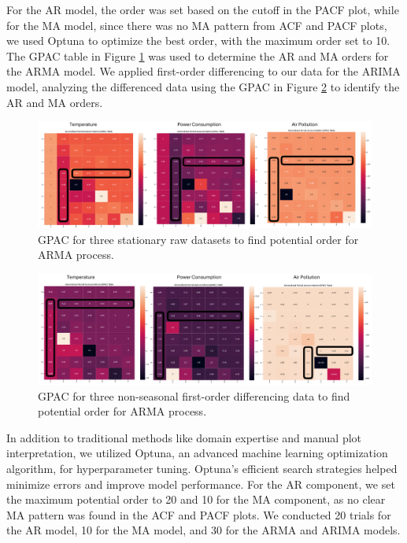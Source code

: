 \documentclass[sn-mathphys-num]{sn-jnl}
\theoremstyle{thmstyleone}%
\theoremstyle{thmstyletwo}%
\theoremstyle{thmstylethree}%
\begin{document}
For the AR model, the order was set based on the cutoff in the PACF plot, while for the MA model, since there was no MA pattern from ACF and PACF plots, we used Optuna to optimize the best order, with the maximum order set to 10. The GPAC table in Figure \ref{fig:gpac1}  was used to determine the AR and MA orders for the ARMA model. We applied first-order differencing to our data for the ARIMA model, analyzing the differenced data using the GPAC in Figure \ref{fig:gpac2} to identify the AR and MA orders.
\begin{figure}[H]
	\begin{center}
		\includegraphics[scale=0.6]{gpac1.pdf}
	\end{center}
	\caption{GPAC for three stationary raw datasets to find potential order for ARMA process.}
	\label{fig:gpac1}
\end{figure}

\begin{figure}[H]
	\begin{center}
		\includegraphics[scale=0.6]{./gpac2.pdf}
	\end{center}
	\caption{GPAC for three non-seasonal first-order differencing data to find potential order for ARMA process.}
	\label{fig:gpac2}
\end{figure}

In addition to traditional methods like domain expertise and manual plot interpretation, we utilized Optuna, an advanced machine learning optimization algorithm, for hyperparameter tuning. Optuna's efficient search strategies helped minimize errors and improve model performance. For the AR component, we set the maximum potential order to 20 and 10 for the MA component, as no clear MA pattern was found in the ACF and PACF plots. We conducted 20 trials for the AR model, 10 for the MA model, and 30 for the ARMA and ARIMA models.
\end{document}
